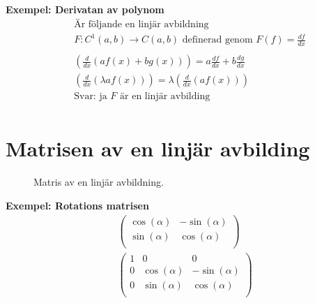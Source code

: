 \begin{multicols}{2}
\textbf{Exempel: Derivatan av polynom}
\begin{align*}
  &\quad  \text{Är följande en linjär avbildning } \\
  &\quad  F:C^1(a,b)\to{C}(a,b) \text{ definerad genom } F(f)=\frac{df}{dx}  \\
  &\quad  \\
  &\quad  \left( \frac{d}{dx}(af(x) + bg(x)) \right) = a\frac{df}{dx} + b\frac{dg}{dx} \\
  &\quad  \left( \frac{d}{dx}(\lambda af(x)) \right) = \lambda  \left( \frac{d}{dx}(af(x)) \right) \\
  &\quad  \text{Svar: ja $F$ är en linjär avbilding} \\
\end{align*}


\section{Matrisen av en linjär avbilding}
\begin{figure}[H]
    \centering
    
    \caption{Matris av en linjär avbildning.}
\end{figure}

\textbf{Exempel: Rotations matrisen}
\begin{align*}
  &\left(\begin{array}{cc}
    \cos(\alpha) & -\sin(\alpha)   \\
    \sin(\alpha) &  \cos(\alpha)   \\
  \end{array}\right)  \\
  &\left(\begin{array}{ccc}
    1 & 0            & 0               \\
    0 & \cos(\alpha) & -\sin(\alpha)   \\
    0 & \sin(\alpha) &  \cos(\alpha)   \\
  \end{array}\right)
\end{align*}



\end{multicols}
